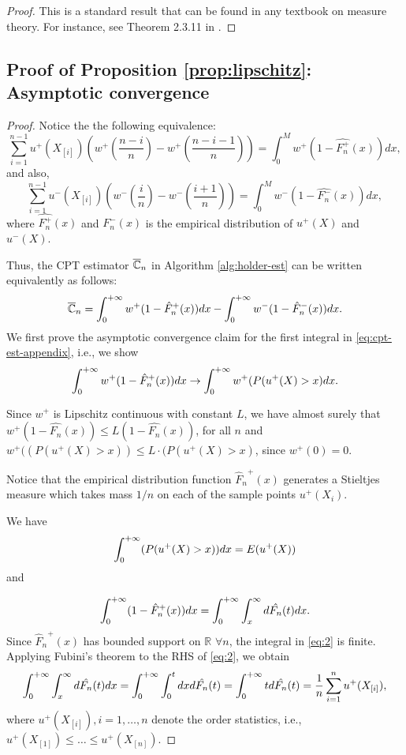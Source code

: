 \begin{proof}
This is a standard result that can be found in any textbook on measure theory. For instance, see Theorem 2.3.11 in \cite{athreya2006measure}.
\end{proof}


\subsection*{Proof of Proposition \ref{prop:lipschitz}: Asymptotic convergence}
\begin{proof}
Notice the the following equivalence:
$$\sum_{i=1}^{n-1} u^+(X_{[i]}) (w^+(\frac{n-i}{n}) - w^+(\frac{n-i-1}{n})) =  \int_0^M w^+(1-\hat{F^+_n}(x)) dx, $$
and also,
$$\sum_{i=1}^{n-1} u^-(X_{[i]}) (w^-(\frac{i}{n}) - w^-(\frac{i+1}{n})) =  \int_0^M w^-(1-\hat{F^-_n}(x)) dx, $$
where $\hat{F^+_n}(x)$ and $\hat{F^-_n}(x)$ is the empirical distribution of $u^+(X)$
and $u^-(X)$.

Thus, the CPT estimator $\overline {\mathbb{C}}_n$ in Algorithm \ref{alg:holder-est} can be written equivalently as follows:
\begin{align}
\overline {\mathbb{C}}_n = \int_0^{+\infty} w^+(1-{\hat F_n}^+(x))  dx - \int_0^{+\infty} w^-(1-{\hat F_n}^-(x))  dx.
\label{eq:cpt-est-appendix}
\end{align}
We first prove the asymptotic convergence claim for the first integral in \eqref{eq:cpt-est-appendix}, i.e., we show
\begin{align}
\int_0^{+\infty} w^+(1-{\hat F_n}^+(x))  dx \rightarrow \int_0^{+\infty} w^+(P(u^+(X)>x) dx.\label{eq:3}
\end{align} 

Since $w^+$ is Lipschitz continuous with constant $L$, we have almost surely that
$w^{+}(1-\hat{F_n}(x)) \leq L (1-\hat{F_n}(x))$,  
for all $n$ and 
 $w^{+}((P(u^+(X)>x)) \leq L\cdot (P(u^+(X)>x)$, since $w^+(0)=0$.
 
Notice that the empirical distribution function 
${\hat F_n}^+(x)$ 
generates a Stieltjes measure which takes mass 
$1/n$ on each of the sample points $u^+(X_{i})$. 

We have
$$\int_0^{+\infty} (P(u^+(X)>x))  dx = E(u^+(X))$$
and

\begin{equation}
\int_0^{+\infty} (1-{\hat F_n}^+(x))  dx =\int_0^{+\infty} \int_x^\infty d \hat{F_n}(t) dx.\label{eq:2}
\end{equation}
Since ${\hat F_n}^+(x)$ has bounded support on $\mathbb{R}$ $\forall n$, the integral in \eqref{eq:2} is finite.
Applying Fubini's theorem to the RHS of \eqref{eq:2}, we obtain
\begin{equation}
\int_0^{+\infty} \int_x^\infty d \hat{F_n}(t) dx = \int_0^{+\infty} \int_0^t dx d \hat{F_n}(t) = \int_0^{+\infty} t d\hat{F_n}(t) = \frac{1}{n} \sum_{i=1}^n u^+(X_{[i]}),
 \end{equation}
 where $u^+(X_{[i]}), i=1,\ldots,n$ denote the order statistics, i.e., $u^+(X_{[1]}) \le \ldots \le u^+(X_{[n]})$.
 

\end{proof}
